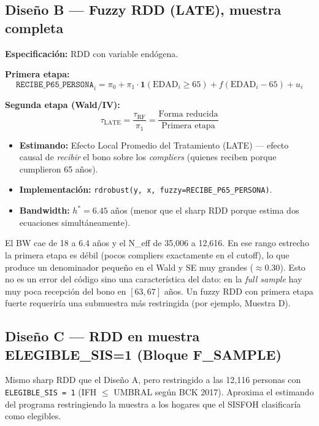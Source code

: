 \documentclass[12pt, a4paper]{article}
\begin{document}
\subsection{Diseño B — Fuzzy RDD (LATE), muestra completa}

\textbf{Especificación:} RDD con variable endógena.

\textbf{Primera etapa:}
$$\texttt{RECIBE\_P65\_PERSONA}_i = \pi_0 + \pi_1 \cdot \mathbf{1}(\text{EDAD}_i \geq 65) + f(\text{EDAD}_i - 65) + u_i$$

\textbf{Segunda etapa (Wald/IV):}
$$\tau_{\text{LATE}} = \frac{\tau_{\text{RF}}}{\pi_1} = \frac{\text{Forma reducida}}{\text{Primera etapa}}$$

\begin{itemize}[noitemsep]
  \item \textbf{Estimando:} Efecto Local Promedio del Tratamiento (LATE) ---
    efecto causal de \textit{recibir} el bono sobre los \textit{compliers}
    (quienes reciben porque cumplieron 65 años).
  \item \textbf{Implementación:} \texttt{rdrobust(y, x, fuzzy=RECIBE\_P65\_PERSONA)}.
  \item \textbf{Bandwidth:} $h^* = 6.45$ años (menor que el sharp RDD porque
    estima dos ecuaciones simultáneamente).
\end{itemize}

\begin{alertcaja}
El BW cae de 18 a 6.4 años y el N\_eff de 35{,}006 a 12{,}616. En ese rango
estrecho la primera etapa es débil (pocos compliers exactamente en el
cutoff), lo que produce un denominador pequeño en el Wald y SE muy grandes
($\approx 0.30$). Esto no es un error del código sino una característica
del dato: en la \textit{full sample} hay muy poca recepción del bono en
$[63, 67]$ años. Un fuzzy RDD con primera etapa fuerte requeriría una
submuestra más restringida (por ejemplo, Muestra D).
\end{alertcaja}

\subsection{Diseño C — RDD en muestra ELEGIBLE\_SIS=1 (Bloque F\_SAMPLE)}

Mismo sharp RDD que el Diseño A, pero restringido a las 12{,}116 personas
con \texttt{ELEGIBLE\_SIS = 1} (IFH $\leq$ UMBRAL según BCK 2017). Aproxima
el estimando del programa restringiendo la muestra a los hogares que el
SISFOH clasificaría como elegibles.
\end{document}
